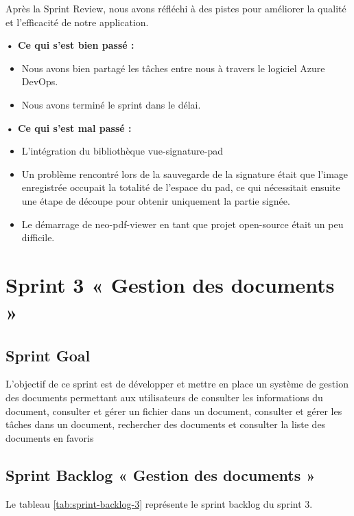 Après la Sprint Review, nous avons réfléchi à des pistes pour améliorer la qualité et l'efficacité de notre application.

\noindent\textbf{•	Ce qui s'est bien passé :}
\begin{itemize}
  \item Nous avons bien partagé les tâches entre nous à travers le logiciel Azure DevOps. 
  \item Nous avons terminé le sprint dans le délai.
\end{itemize}

\noindent\textbf{•	Ce qui s'est mal passé :}
\begin{itemize}
  \item L'intégration du bibliothèque vue-signature-pad
  \item Un problème rencontré lors de la sauvegarde de la signature était que l'image enregistrée occupait la totalité de l'espace du pad, ce qui nécessitait ensuite une étape de découpe pour obtenir uniquement la partie signée.
  \item Le démarrage de neo-pdf-viewer en tant que projet open-source était un peu difficile.
\end{itemize}

\section{Sprint 3 « Gestion des documents »}
\subsection{Sprint Goal}

L'objectif de ce sprint est de développer et mettre en place un système de gestion des documents permettant aux utilisateurs de consulter les informations du document, consulter et gérer un fichier dans un document, consulter et gérer les tâches dans un document, rechercher des documents et consulter la liste des documents en favoris

\pagebreak

\subsection{Sprint Backlog « Gestion des documents »}

Le tableau \ref{tab:sprint-backlog-3} représente le sprint backlog du sprint 3.

